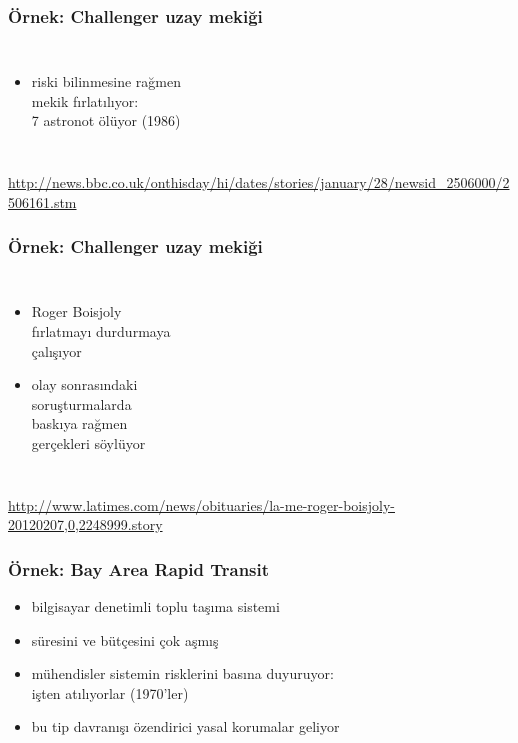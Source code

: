\documentclass[dvipsnames]{beamer}
\theoremstyle{plain}
\begin{document}
\begin{frame}
  \frametitle{Örnek: Challenger uzay mekiği}

  \begin{columns}

    \begin{itemize}
      \item riski bilinmesine rağmen\\
        mekik fırlatılıyor:\\
        7 astronot ölüyor (1986)
    \end{itemize}
  \end{columns}

  \medskip
  \tiny{\url{http://news.bbc.co.uk/onthisday/hi/dates/stories/january/28/newsid_2506000/2506161.stm}}\\
\end{frame}

\begin{frame}
  \frametitle{Örnek: Challenger uzay mekiği}

  \begin{columns}

    \begin{itemize}
      \item Roger Boisjoly\\
        fırlatmayı durdurmaya\\
        çalışıyor
      \item olay sonrasındaki\\
        soruşturmalarda\\
        baskıya rağmen\\
        gerçekleri söylüyor
    \end{itemize}
  \end{columns}

  \medskip
  \tiny{\url{http://www.latimes.com/news/obituaries/la-me-roger-boisjoly-20120207,0,2248999.story}}\\
\end{frame}

\begin{frame}
  \frametitle{Örnek: Bay Area Rapid Transit}

  \begin{itemize}
    \item bilgisayar denetimli toplu taşıma sistemi
    \item süresini ve bütçesini çok aşmış
    \item mühendisler sistemin risklerini basına duyuruyor:\\
      işten atılıyorlar (1970'ler)

    \medskip
    \item bu tip davranışı özendirici yasal korumalar geliyor
  \end{itemize}
\end{frame}
\end{document}
